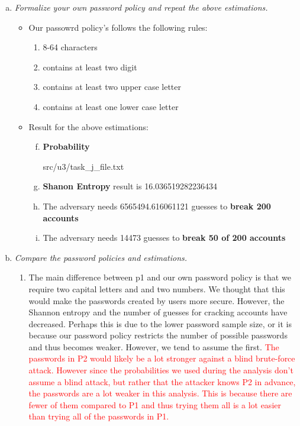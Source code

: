 \begin{enumerate}[(a)]
    \item {\itshape Formalize your own password policy and repeat the above estimations.}
    \begin{itemize}
        \item Our passowrd policy's follows the following rules:
            \begin{enumerate}[1.]
                \item 8-64 characters
                \item contains at least two digit
                \item contains at least two upper case letter
                \item contains at least one lower case letter
            \end{enumerate}
        \item Result for the above estimations:
                \begin{enumerate}[a)]
                    \setcounter{enumii}{5}
                    \item \textbf{Probability}
                        
                            {src/u3/task_j_file.txt}
                    \item \textbf{Shanon Entropy} result is 16.036519282236434
                    \item The adversary needs 6565494.616061121 guesses to \textbf{break 200 accounts}
                    \item The adversary needs 14473 guesses to \textbf{break 50 of 200 accounts}
                \end{enumerate}
    \end{itemize}

    
    
    \item {\itshape Compare the password policies and estimations.}
    \begin{enumerate}[]
        \item The main difference between p1 and our own password policy is that we require two capital letters and and two numbers. We thought that this would make the passwords created by users more secure. However, the Shannon entropy and the number of guesses for cracking accounts have decreased. Perhaps this is due to the lower password sample size, or it is because our password policy restricts the number of possible passwords and thus becomes weaker. However, we tend to assume the first. \textcolor{red}{The passwords in P2 would likely be a lot stronger against a blind brute-force attack. However since the probabilities we used during the analysis don’t assume a blind attack, but rather that the attacker knows P2 in advance, the passwords are a lot weaker in this analysis. This is because there are fewer of them compared to P1 and thus trying them all is a lot easier than trying all of the passwords in P1.}
        

\end{enumerate}
\end{enumerate}
